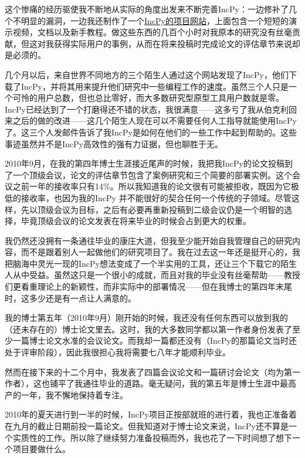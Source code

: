 \documentclass[letter,12pt]{book}
\begin{document}
\begin{CJK}{UTF8}{gbsn}
\breakline

这个惨痛的经历驱使我不断地从实际的角度出发来不断完善IncPy：一边修补了几个不明显的漏洞，一边我还制作了一个\href{http://www.pgbovine.net/incpy.html}{IncPy的项目网站}，上面包含一个短短的演示视频，文档以及新手教程。做这些东西的几百个小时对我原本的研究没有丝毫贡献，但这对我获得实际用户的事例，从而在将来投稿时完成论文的评估章节来说却是必须的。

几个月以后，来自世界不同地方的三个陌生人通过这个网站发现了IncPy，他们下载了IncPy，并将其用来提升他们研究中一些编程工作的速度。虽然三个人只是一个可怜的用户总数，但也总比零好，而大多数研究型原型工具用户数就是零。IncPy已经达到了一个打磨得还不错的状态，我很满意——这多亏了我从伯克利回来之后的做的改进——这几个陌生人现在可以不需要任何人工指导就能使用IncPy了。这三个人发邮件告诉了我IncPy是如何在他们的一些工作中起到帮助的。这些事迹虽然并不是IncPy高效性的强有力证据，但也聊胜于无。

2010年9月，在我的第四年博士生涯接近尾声的时候，我把我IncPy的论文投稿到了一个顶级会议，论文的评估章节包含了案例研究和三个简要的部署实例。这个会议之前一年的接收率只有14\%。所以我知道我的论文很有可能被拒收，既因为它极低的接收率，也因为我的IncPy 并不能很好的契合任何一个传统的子领域。尽管这样，先以顶级会议为目标，之后有必要再重新投稿到二级会议仍是一个明智的选择，毕竟顶级会议的论文发表在将来毕业的时候会占到更大的权重。

我仍然还没拥有一条通往毕业的康庄大道，但我至少能开始自我管理自己的研究内容，而不是跟着别人一起做他们的研究项目了。我在过去这一年还是挺开心的，我把脑海中灵光一现的IncPy想法变成了一个半实用的工具，还让三个下载它的陌生人从中受益。虽然这只是一个很小的成就，而且对我的毕业没有丝毫帮助——教授们更看重理论上的新颖性，而非实际中的部署情况——但在我博士的第四年末尾时，这多少还是有一点让人满意的。

我的博士第五年（2010年9月）刚开始的时候，我还没有任何东西可以放到我的（还未存在的）博士论文里去。这时，我的大多数同学都以第一作者身份发表了至少一篇博士论文水准的会议论文。而我却一篇都还没有（IncPy的那篇论文当时还处于评审阶段），因此我很担心我将需要七八年才能顺利毕业。

然而在接下来的十二个月中，我发表了四篇会议论文和一篇研讨会论文（均为第一作者），这也铺平了我通往毕业的道路。毫无疑问，我的第五年是博士生涯中最高产的一年，我不懈地保持着专注。

\breakline

2010年的夏天进行到一半的时候，IncPy项目正按部就班的进行着，我也正准备着在九月的截止日期前投一篇论文。但我知道对于博士论文来说，IncPy还不算是一个实质性的工作。所以除了继续努力准备投稿而外，我也花了一下时间想了想下一个项目要做什么。


\end{CJK}
\end{document}
